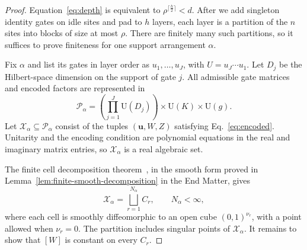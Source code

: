 \documentclass[aps,prl,reprint,notitlepage,nofootinbib,nobibnotes]{revtex4-2}
\newcommand{\UU}{\mathrm U}
\begin{document}
\begin{proof}
Equation~\eqref{eq:depth} is equivalent to
\(\rho^{\lceil \frac{h}{2}\rceil}<d\).
After we add singleton identity gates on idle sites and pad to
\(h\) layers, each layer is a partition of the \(n\) sites into blocks
of size at most \(\rho\). There are finitely many such partitions,
so it suffices to prove finiteness for one support arrangement
\(\alpha\).

Fix \(\alpha\) and list its gates in layer order as
\(u_1,\ldots,u_J\), with \(U=u_J\cdots u_1\).
Let \(D_j\) be the Hilbert-space dimension on the support of gate \(j\).
All admissible gate matrices and encoded factors are represented in
\[
  \mathcal P_\alpha=
  \left(\prod_{j=1}^{J}\UU(D_j)\right)
    \times\UU(K)\times\UU(g).
\]
Let \(\mathcal X_\alpha\subseteq\mathcal P_\alpha\) consist of the tuples
\((\mathbf u,W,Z)\) satisfying Eq.~\eqref{eq:encoded}.
Unitarity and the encoding condition are polynomial equations in the
real and imaginary matrix entries, so \(\mathcal X_\alpha\) is a real
algebraic set.

The finite cell decomposition theorem~\cite[Cor.~8.4]{Plaumann}, in the smooth form proved in
Lemma~\ref{lem:finite-smooth-decomposition} in the End Matter, gives
\begin{equation}\label{eq:cells}
  \mathcal X_\alpha=\bigsqcup_{r=1}^{N_\alpha}C_r,
  \qquad N_\alpha<\infty,
\end{equation}
where each cell is smoothly diffeomorphic to an open cube
\((0,1)^{\nu_r}\), with a point allowed when \(\nu_r=0\).
The partition includes singular points of \(\mathcal X_\alpha\).
It remains to show that \([W]\) is constant on every \(C_r\).


\end{proof}
\end{document}
